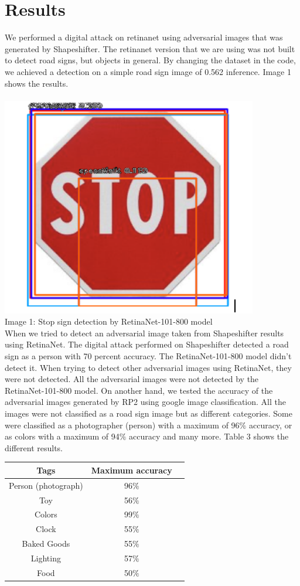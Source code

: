 \documentclass[sigconf, nonacm]{acmart}
\begin{document}
\section{Results}
We performed a digital attack on retinanet using adversarial images that was generated by Shapeshifter. The retinanet version that we are using was not built to detect road signs, but objects in general. By changing the dataset in the code, we achieved a detection on  a simple road sign image of 0.562 inference. Image 1 shows the results. \\
\\
\includegraphics[scale=0.40]{stop sign.png}
\\
Image 1: Stop sign detection by RetinaNet-101-800 model
\\
When we tried to detect an adversarial image taken from Shapeshifter results using RetinaNet. The digital attack performed on Shapeshifter detected a road sign as a person with 70 percent accuracy. The RetinaNet-101-800 model didn’t detect it. When trying to detect other adversarial images using RetinaNet, they were not detected. All the adversarial images were not detected by the RetinaNet-101-800 model.  
On another hand, we tested the accuracy of the adversarial images generated by RP2 using google image classification. All the images were not classified as a road sign image but as different categories. Some were classified as a photographer (person) with a maximum of 96$\%$ accuracy, or as colors with a maximum of 94$\%$ accuracy and many more. Table 3 shows the different results. 
\begin{table}[hb]%
  \label{tab:freq}
  \begin{tabular}{ccl}
    \toprule
    Tags & Maximum accuracy \\
    \midrule
    Person (photograph) & 96$\%$ \\
    Toy & 56$\%$ \\
    Colors & 99$\%$ \\
    Clock & 55$\%$ \\
    Baked Goods & 55$\%$ \\
    Lighting & 57$\%$ \\
    Food & 50$\%$
  \bottomrule
\end{tabular}
\end{table}
\end{document}
